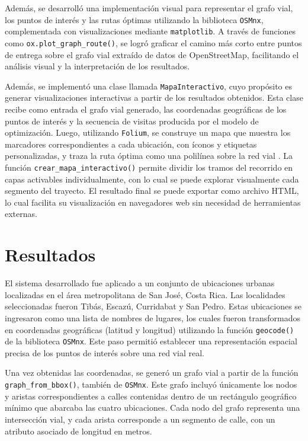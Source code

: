 \documentclass[a4paper,12pt]{article}
\begin{document}
Además, se desarrolló una implementación visual para representar el grafo vial, los puntos de interés y las rutas óptimas utilizando la biblioteca \texttt{OSMnx}, complementada con visualizaciones mediante \texttt{matplotlib}. A través de funciones como \texttt{ox.plot\_graph\_route()}, se logró graficar el camino más corto entre puntos de entrega sobre el grafo vial extraído de datos de OpenStreetMap, facilitando el análisis visual y la interpretación de los resultados.

Además, se implementó una clase llamada \texttt{MapaInteractivo}, cuyo propósito es generar visualizaciones interactivas a partir de los resultados obtenidos. Esta clase recibe como entrada el grafo vial generado, las coordenadas geográficas de los puntos de interés y la secuencia de visitas producida por el modelo de optimización. Luego, utilizando \texttt{Folium}, se construye un mapa que muestra los marcadores correspondientes a cada ubicación, con íconos y etiquetas personalizadas, y traza la ruta óptima como una polilínea sobre la red vial \cite{folium_polyline}. La función \texttt{crear\_mapa\_interactivo()} permite dividir los tramos del recorrido en capas activables individualmente, con lo cual se puede explorar visualmente cada segmento del trayecto. El resultado final se puede exportar como archivo HTML, lo cual facilita su visualización en navegadores web sin necesidad de herramientas externas.


\newpage
\section{Resultados}

El sistema desarrollado fue aplicado a un conjunto de ubicaciones urbanas localizadas en el área metropolitana de San José, Costa Rica. Las localidades seleccionadas fueron Tibás, Escazú, Curridabat y San Pedro. Estas ubicaciones se ingresaron como una lista de nombres de lugares, los cuales fueron transformados en coordenadas geográficas (latitud y longitud) utilizando la función \texttt{geocode()} de la biblioteca \texttt{OSMnx}. Este paso permitió establecer una representación espacial precisa de los puntos de interés sobre una red vial real.

Una vez obtenidas las coordenadas, se generó un grafo vial a partir de la función \texttt{graph\_from\_bbox()}, también de \texttt{OSMnx}. Este grafo incluyó únicamente los nodos y aristas correspondientes a calles contenidas dentro de un rectángulo geográfico mínimo que abarcaba las cuatro ubicaciones. Cada nodo del grafo representa una intersección vial, y cada arista corresponde a un segmento de calle, con un atributo asociado de longitud en metros.
\end{document}
